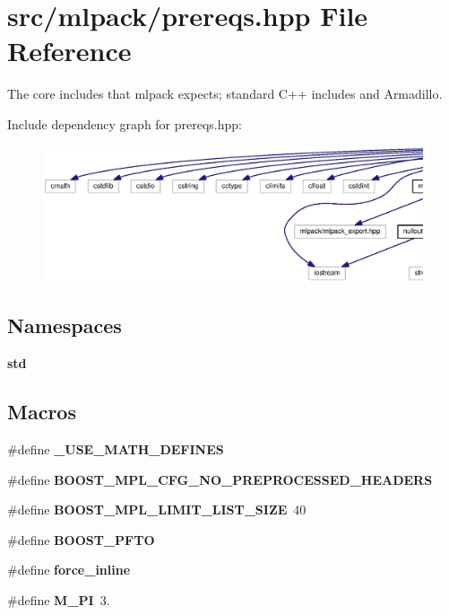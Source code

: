 \section{src/mlpack/prereqs.hpp File Reference}
\label{prereqs_8hpp}


The core includes that mlpack expects; standard C++ includes and Armadillo.  


Include dependency graph for prereqs.\+hpp\+:
\nopagebreak
\begin{figure}[H]
\begin{center}
\leavevmode
\includegraphics[width=350pt]{prereqs_8hpp__incl}
\end{center}
\end{figure}
\subsection*{Namespaces}
\begin{DoxyCompactItemize}
\item 
 {\bf std}
\end{DoxyCompactItemize}
\subsection*{Macros}
\begin{DoxyCompactItemize}
\item 
\#define {\bf \+\_\+\+U\+S\+E\+\_\+\+M\+A\+T\+H\+\_\+\+D\+E\+F\+I\+N\+ES}
\item 
\#define {\bf B\+O\+O\+S\+T\+\_\+\+M\+P\+L\+\_\+\+C\+F\+G\+\_\+\+N\+O\+\_\+\+P\+R\+E\+P\+R\+O\+C\+E\+S\+S\+E\+D\+\_\+\+H\+E\+A\+D\+E\+RS}
\item 
\#define {\bf B\+O\+O\+S\+T\+\_\+\+M\+P\+L\+\_\+\+L\+I\+M\+I\+T\+\_\+\+L\+I\+S\+T\+\_\+\+S\+I\+ZE}~40
\item 
\#define {\bf B\+O\+O\+S\+T\+\_\+\+P\+F\+TO}
\item 
\#define {\bf force\+\_\+inline}
\item 
\#define {\bf M\+\_\+\+PI}~3.
\end{DoxyCompactItemize}
